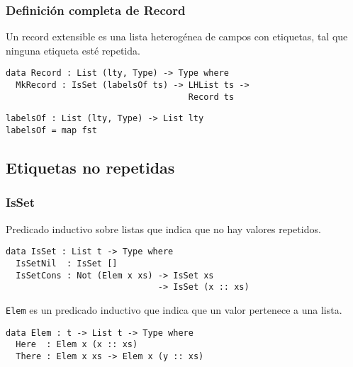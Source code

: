 \documentclass{beamer}
\begin{document}
\begin{frame}[fragile]
\frametitle{Definición completa de Record}

Un record extensible es una lista heterogénea de campos con etiquetas, tal que ninguna etiqueta esté repetida.

\pause

\begin{example}
\begin{verbatim}
data Record : List (lty, Type) -> Type where
  MkRecord : IsSet (labelsOf ts) -> LHList ts ->
                                    Record ts
\end{verbatim}
\end{example}

\begin{example}
\begin{verbatim}
labelsOf : List (lty, Type) -> List lty
labelsOf = map fst
\end{verbatim}
\end{example}

\end{frame}

\subsection{Etiquetas no repetidas}

\begin{frame}[fragile]
\frametitle{IsSet}

Predicado inductivo sobre listas que indica que no hay valores repetidos.

\pause

\begin{example}
\begin{verbatim}
data IsSet : List t -> Type where
  IsSetNil  : IsSet []
  IsSetCons : Not (Elem x xs) -> IsSet xs
                              -> IsSet (x :: xs)
\end{verbatim}
\end{example}

\pause

\texttt{Elem} es un predicado inductivo que indica que un valor pertenece a una lista.

\begin{example}
\begin{verbatim}
data Elem : t -> List t -> Type where
  Here  : Elem x (x :: xs)
  There : Elem x xs -> Elem x (y :: xs)
\end{verbatim}
\end{example}

\end{frame}
\end{document}
